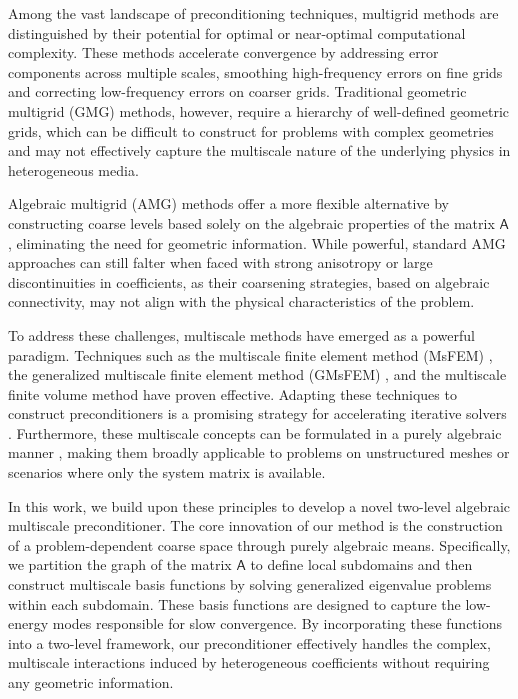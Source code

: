 \documentclass[preprint,12pt]{elsarticle}
\begin{document}
  Among the vast landscape of preconditioning techniques, multigrid methods are distinguished
  by their potential for optimal or near-optimal computational complexity. These
  methods accelerate convergence by addressing error components across multiple
  scales, smoothing high-frequency errors on fine grids and correcting low-frequency
  errors on coarser grids. Traditional geometric multigrid (GMG) methods, however,
  require a hierarchy of well-defined geometric grids, which can be difficult to
  construct for problems with complex geometries and may not effectively capture
  the multiscale nature of the underlying physics in heterogeneous media.

  Algebraic multigrid (AMG) methods offer a more flexible alternative by constructing
  coarse levels based solely on the algebraic properties of the matrix $\mathsf{A}$,
  eliminating the need for geometric information. While powerful, standard AMG
  approaches can still falter when faced with strong anisotropy or large
  discontinuities in coefficients, as their coarsening strategies, based on
  algebraic connectivity, may not align with the physical characteristics of the
  problem.

  To address these challenges, multiscale methods have emerged as a powerful
  paradigm. Techniques such as the multiscale finite element method (MsFEM) \cite{hou1997multiscale},
  the generalized multiscale finite element method (GMsFEM)
  \cite{chung2023multiscale, efendiev2013generalized}, and the multiscale finite
  volume method \cite{jenny2003multi, hajibeygi2009multiscale} have proven effective.
  Adapting these techniques to construct preconditioners is a promising strategy
  for accelerating iterative solvers
  \cite{fu2024adaptive, ye2024robust, ye2025highly, zhou2024robust}. Furthermore,
  these multiscale concepts can be formulated in a purely algebraic manner
  \cite{heinlein2025algebraic, wang2014algebraic}, making them broadly applicable
  to problems on unstructured meshes or scenarios where only the system matrix is
  available.

  In this work, we build upon these principles to develop a novel two-level
  algebraic multiscale preconditioner. The core innovation of our method is the construction
  of a problem-dependent coarse space through purely algebraic means.
  Specifically, we partition the graph of the matrix $\mathsf{A}$ to define local
  subdomains and then construct multiscale basis functions by solving generalized
  eigenvalue problems within each subdomain. These basis functions are designed
  to capture the low-energy modes responsible for slow convergence. By incorporating
  these functions into a two-level framework, our preconditioner effectively
  handles the complex, multiscale interactions induced by heterogeneous coefficients
  without requiring any geometric information.
\end{document}
